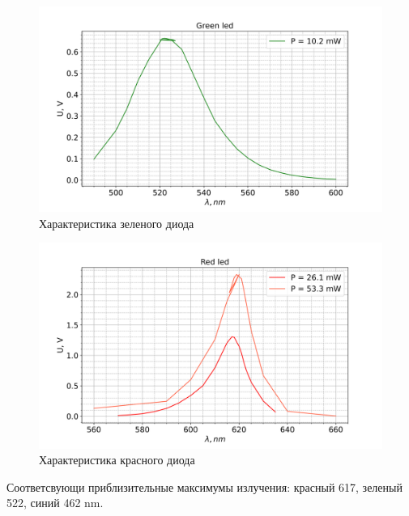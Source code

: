 \documentclass[a4paper]{article}
\begin{document}
\begin{enumerate}
                \begin{figure}[H]
                    \begin{center}
                        \includegraphics[scale=0.5]{spectr_green_led.png}
                        \caption{Характеристика зеленого диода}
                        \label{green}
                    \end{center}
                \end{figure}

                \begin{figure}[H]
                    \begin{center}
                        \includegraphics[scale=0.5]{spectr_red_led.png}
                        \caption{Характеристика красного диода}
                        \label{red}
                    \end{center}
                \end{figure}
                
                \par Соответсвующи приблизительные максимумы излучения: красный 617, зеленый 522, синий 462 nm.

	    \end{enumerate}
\end{document}
